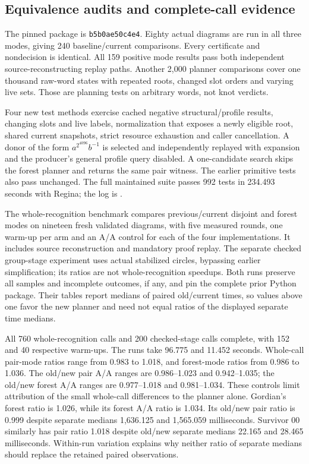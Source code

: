 \subsection{Equivalence audits and complete-call evidence}

The pinned package is \texttt{b5b0ae50c4e4}. Eighty actual diagrams are run
in all three modes, giving 240 baseline/current comparisons. Every certificate
and nondecision is identical. All 159 positive mode results pass both
independent source-reconstructing replay paths. Another 2,000 planner
comparisons cover one thousand raw-word states with repeated roots, changed
slot orders and varying live sets. Those are planning tests on arbitrary
words, not knot verdicts.

Four new test methods exercise cached negative structural/profile results,
changing slots and live labels, normalization that exposes a newly eligible
root, shared current snapshots, strict resource exhaustion and caller
cancellation. A donor of the form $a^{2^{4096}}b^{-1}$ is selected and
independently replayed with expansion and the producer's general profile
query disabled. A one-candidate search skips the forest planner and returns
the same pair witness. The earlier primitive tests also pass unchanged.
The full maintained suite passes 992 tests in 234.493 seconds with Regina;
the log is .




The whole-recognition benchmark compares previous/current disjoint and forest
modes on nineteen fresh validated diagrams, with five measured rounds, one
warm-up per arm and an A/A control for each of the four implementations.
It includes source reconstruction and mandatory proof replay. The separate
checked group-stage experiment uses actual stabilized circles, bypassing
earlier simplification; its ratios are not whole-recognition speedups.
Both runs preserve all samples and incomplete outcomes, if any, and pin
the complete prior Python package. Their tables report medians of paired
old/current times, so values above one favor the new planner and need not
equal ratios of the displayed separate time medians.

All 760 whole-recognition calls and 200 checked-stage calls complete,
with 152 and 40 respective warm-ups. The runs take 96.775 and 11.452
seconds. Whole-call pair-mode ratios range from 0.983 to 1.018, and
forest-mode ratios from 0.986 to 1.036. The old/new pair A/A ranges are
0.986--1.023 and 0.942--1.035; the old/new forest A/A ranges are
0.977--1.018 and 0.981--1.034. These controls limit attribution of the
small whole-call differences to the planner alone. Gordian's forest ratio
is 1.026, while its forest A/A ratio is 1.034. Its old/new pair ratio is
0.999 despite separate medians 1,636.125 and 1,565.059 milliseconds.
Survivor 00 similarly has pair ratio 1.018 despite old/new separate medians
22.165 and 28.465 milliseconds. Within-run variation explains why neither
ratio of separate medians should replace the retained paired observations.

